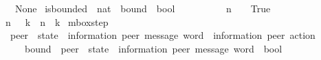 \begin{isabellebody}
\ \ {\isachardoublequoteopen}{\isasyminfinity}\ {\isasymequiv}\ None{\isachardoublequoteclose}\isanewline
\isanewline
{}\isamarkupfalse%
\ is{\isacharunderscore}{\kern0pt}bounded\ {\isacharcolon}{\kern0pt}{\isacharcolon}{\kern0pt}\ {\isachardoublequoteopen}nat\ {\isasymRightarrow}\ bound\ {\isasymRightarrow}\ bool{\isachardoublequoteclose}\ \ {\isacharparenleft}{\kern0pt}{\isachardoublequoteopen}{\isacharunderscore}{\kern0pt}\ {\isacharless}{\kern0pt}\isactrlsub {\isasymB}\ {\isacharunderscore}{\kern0pt}{\isachardoublequoteclose}\ {\isacharbrackleft}{\kern0pt}{}{}{\isacharcomma}{\kern0pt}\ {}{}{\isacharbrackright}{\kern0pt}\ {}{}{}{\isacharparenright}{\kern0pt}\ \isanewline
\ \ {\isachardoublequoteopen}n\ {\isacharless}{\kern0pt}\isactrlsub {\isasymB}\ {\isasyminfinity}\ {\isacharequal}{\kern0pt}\ True{\isachardoublequoteclose}\ {\isacharbar}{\kern0pt}\isanewline
\ \ {\isachardoublequoteopen}n\ {\isacharless}{\kern0pt}\isactrlsub {\isasymB}\ {\isasymB}\ k\ {\isacharequal}{\kern0pt}\ {\isacharparenleft}{\kern0pt}n\ {\isacharless}{\kern0pt}\ k{\isacharparenright}{\kern0pt}{\isachardoublequoteclose}\isanewline
\isanewline
{}\isamarkupfalse%
\ mbox{\isacharunderscore}{\kern0pt}step\isanewline
\ \ {\isacharcolon}{\kern0pt}{\isacharcolon}{\kern0pt}\ {\isachardoublequoteopen}{\isacharparenleft}{\kern0pt}{\isacharprime}{\kern0pt}peer\ {\isasymRightarrow}\ {\isacharparenleft}{\kern0pt}{\isacharprime}{\kern0pt}state\ {\isasymtimes}\ {\isacharparenleft}{\kern0pt}{\isacharprime}{\kern0pt}information{\isacharcomma}{\kern0pt}\ {\isacharprime}{\kern0pt}peer{\isacharparenright}{\kern0pt}\ message\ word{\isacharparenright}{\kern0pt}{\isacharparenright}{\kern0pt}\ {\isasymRightarrow}\ {\isacharparenleft}{\kern0pt}{\isacharprime}{\kern0pt}information{\isacharcomma}{\kern0pt}\ {\isacharprime}{\kern0pt}peer{\isacharparenright}{\kern0pt}\ action\ {\isasymRightarrow}\isanewline
\ \ \ \ \ \ bound\ {\isasymRightarrow}\ {\isacharparenleft}{\kern0pt}{\isacharprime}{\kern0pt}peer\ {\isasymRightarrow}\ {\isacharparenleft}{\kern0pt}{\isacharprime}{\kern0pt}state\ {\isasymtimes}\ {\isacharparenleft}{\kern0pt}{\isacharprime}{\kern0pt}information{\isacharcomma}{\kern0pt}\ {\isacharprime}{\kern0pt}peer{\isacharparenright}{\kern0pt}\ message\ word{\isacharparenright}{\kern0pt}{\isacharparenright}{\kern0pt}\ {\isasymRightarrow}\ bool{\isachardoublequoteclose}\ \isanewline

\end{isabellebody}
